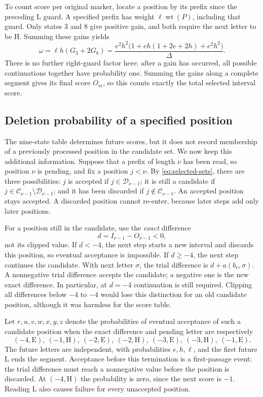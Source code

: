 \documentclass[11pt,a4paper]{article}
\theoremstyle{definition}
\theoremstyle{remark}
\newcommand{\wt}{\operatorname{wt}}
\newcommand{\E}{\mathrm E}
\newcommand{\HH}{\mathrm H}
\newcommand{\LL}{\mathrm L}
\begin{document}
To count score per original marker, locate a position by its prefix since the preceding $\LL$ guard. A specified prefix has weight $\ell\wt(P)$, including that guard. Only states 3 and 8 give positive gain, and both require the next letter to be $\HH$. Summing these gains yields
\begin{equation}\label{eq:omegaformula}
\omega=\ell h(G_3+2G_8)
=\frac{e^2h^2\bigl(1+eh(1+2e+2h)+e^2h^2\bigr)}{\Delta}.
\end{equation}
There is no further right-guard factor here: after a gain has occurred, all possible continuations together have probability one. Summing the gains along a complete segment gives its final score $O_m$, so this counts exactly the total selected interval score.

\subsection{Deletion probability of a specified position}\label{sec:firstpassage}
The nine-state table determines future scores, but it does not record membership of a previously processed position in the candidate set. We now keep this additional information. Suppose that a prefix of length $\nu$ has been read, so position $\nu$ is pending, and fix a position $j<\nu$. By \eqref{eq:selected-sets}, there are three possibilities: $j$ is accepted if $j\in\mathcal D_{\nu-1}$; it is still a candidate if $j\in\mathcal C_{\nu-1}\setminus\mathcal D_{\nu-1}$; and it has been discarded if $j\notin\mathcal C_{\nu-1}$. An accepted position stays accepted. A discarded position cannot re-enter, because later steps add only later positions.

For a position still in the candidate, use the \emph{exact} difference
\[
d=I_{\nu-1}-O_{\nu-1}<0,
\]
not its clipped value. If $d<-4$, the next step starts a new interval and discards this position, so eventual acceptance is impossible. If $d\ge-4$, the next step continues the candidate. With next letter $\sigma$, the trial difference is $d+a(b_\nu,\sigma)$. A nonnegative trial difference accepts the candidate; a negative one is the new exact difference. In particular, at $d=-4$ continuation is still required. Clipping all differences below $-4$ to $-4$ would lose this distinction for an old candidate position, although it was harmless for the score table.

Let $r,u,v,w,x,y,z$ denote the probabilities of eventual acceptance of such a candidate position when the exact difference and pending letter are respectively
\[
(-4,\E),\ (-1,\HH),\ (-2,\E),\ (-2,\HH),\ (-3,\E),\ (-3,\HH),\ (-1,\E).
\]
The future letters are independent, with probabilities $e,h,\ell$, and the first future $\LL$ ends the segment. Acceptance before this termination is a first-passage event: the trial difference must reach a nonnegative value before the position is discarded. At $(-4,\HH)$ the probability is zero, since the next score is $-1$. Reading $\LL$ also causes failure for every unaccepted position.
\end{document}
